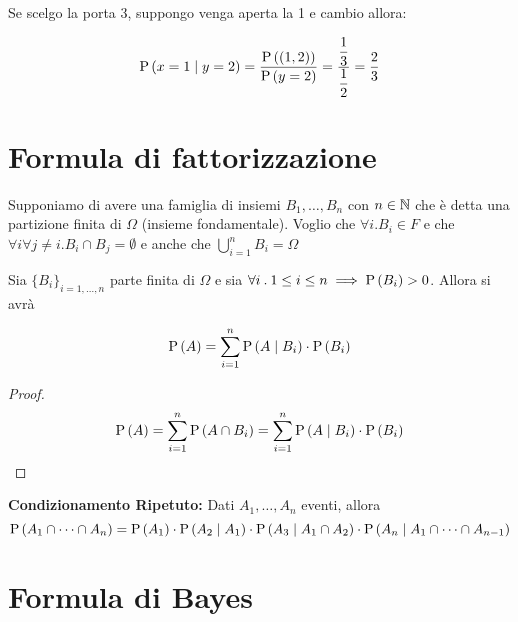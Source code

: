 Se scelgo la porta 3, suppongo venga aperta la 1 e cambio allora:

\begin{equation}
	\text{P}\left(x=1  \mid  y=2\right) = \dfrac{\text{P}\left((1,2)\right)}{\text{P}\left(y=2\right)} = \dfrac{\dfrac{1}{3}}{\dfrac{1}{2}} = \dfrac{2}{3}
\end{equation}

\section{Formula di fattorizzazione}


Supponiamo di avere una famiglia di insiemi $ B_1, \dots, B_n $ con $ n \in \mathbb{N} $ che è detta una partizione finita di $ \Omega $ (insieme fondamentale). Voglio che $ \forall i . B_i \in F $ e che $ \forall i \forall j\neq i . B_i \cap B_j = \emptyset $ e anche che $ \bigcup_{i=1}^{n} B_i = \Omega $


\begin{lem}
	Sia $ \{B_i\}_{i=1, \dots, n} $ parte finita di $ \Omega $ e sia $ \forall i \>.\> 1 \leq i \leq n \implies \text{P}\left(B_i\right) > 0 $. Allora si avrà
	
	\begin{equation}
		\text{P}\left(A\right) = \sum_{i=1}^{n} \text{P}\left(A \mid B_i\right) \cdot \text{P}\left(B_i\right)
	\end{equation}
	
	\begin{proof}
		\begin{equation*}
			\text{P}\left(A\right) =  \sum_{i=1}^{n} \text{P}\left(A \cap B_i\right) = \sum_{i=1}^{n} \text{P}\left(A \mid B_i\right) \cdot \text{P}\left(B_i\right)
		\end{equation*}
	\end{proof}
\end{lem}

\begin{defn}
	\textbf{Condizionamento Ripetuto:}
	Dati $ A_1, \dots, A_n $ eventi, allora 
	\begin{equation*}
		\text{P}\left(A_1 \cap \dots \cap A_n\right) = \text{P}\left(A_1\right) \cdot \text{P}\left(A_2 \mid A_1\right) \cdot \text{P}\left(A_3 \mid  A_1 \cap A_2\right) \cdot \text{P}\left(A_n  \mid  A_1 \cap \dots \cap A_{n-1}\right)
	\end{equation*}
\end{defn}

\section{Formula di Bayes}

